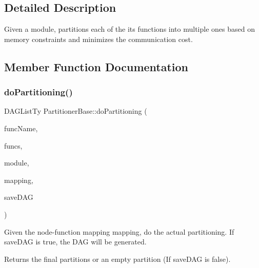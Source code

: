 \subsection{Detailed Description}
Given a module, partitions each of the its functions into multiple ones based on memory constraints and minimizes the communication cost. 

\subsection{Member Function Documentation}
\mbox{\label{classglow_1_1_partitioner_base_a6fe7a0c542bd37744dd2667b86cdbf73}} 
\subsubsection{\texorpdfstring{do\+Partitioning()}{doPartitioning()}}
{\footnotesize\ttfamily D\+A\+G\+List\+Ty Partitioner\+Base\+::do\+Partitioning (\begin{DoxyParamCaption}\item[{llvm\+::\+String\+Ref}]{func\+Name,  }\item[{std\+::vector$<$ \hyperlink{classglow_1_1_function}{Function} $\ast$$>$}]{funcs,  }\item[{\hyperlink{classglow_1_1_module}{Module} $\ast$}]{module,  }\item[{\hyperlink{classglow_1_1_node_to_function_map}{Node\+To\+Function\+Map} \&}]{mapping,  }\item[{bool}]{save\+D\+AG }\end{DoxyParamCaption})\hspace{0.3cm}{\ttfamily [protected]}}

Given the node-\/function mapping {\ttfamily mapping}, do the actual partitioning. If {\ttfamily save\+D\+AG} is true, the D\+AG will be generated. \begin{DoxyReturn}{Returns}
the final partitions or an empty partition (If {\ttfamily save\+D\+AG} is false). 
\end{DoxyReturn}
\mbox{\label{classglow_1_1_partitioner_base_ae4c7498ec2510ff9b226191e5f479d43}} 
